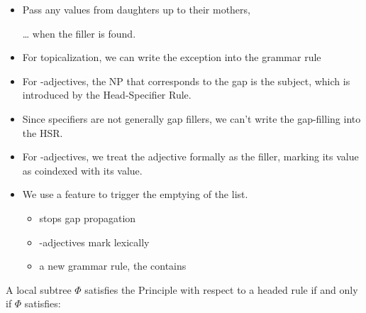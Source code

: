\documentclass[a4paper,landscape,headrule,footrule]{foils}
\begin{document}
\MyLogo{}
\begin{itemize}
\item Pass any  values from daughters up to their
mothers,
\item[\ldots]  when the filler is found.
\item For topicalization, we can write the exception into
the grammar rule
\item For -adjectives, the NP that corresponds to the
gap is the subject, which is introduced by the
Head-Specifier Rule.
\item Since specifiers are not generally gap fillers, we
can't write the gap-filling into the HSR.
\end{itemize}

\begin{itemize}
\item For -adjectives, we treat the adjective formally
as the filler, marking its  value as coindexed
with its  value.
\item We use a feature  to trigger the
  emptying of the  list.
  \begin{itemize}
  \item {} stops gap propagation
  \item {}-adjectives mark  lexically
  \item a new grammar rule, the 
    contains 
  \end{itemize}
\end{itemize}

A local subtree $\Phi$ satisfies the  Principle with respect to a
headed rule  if and only if $\Phi$ satisfies:



\end{document}
